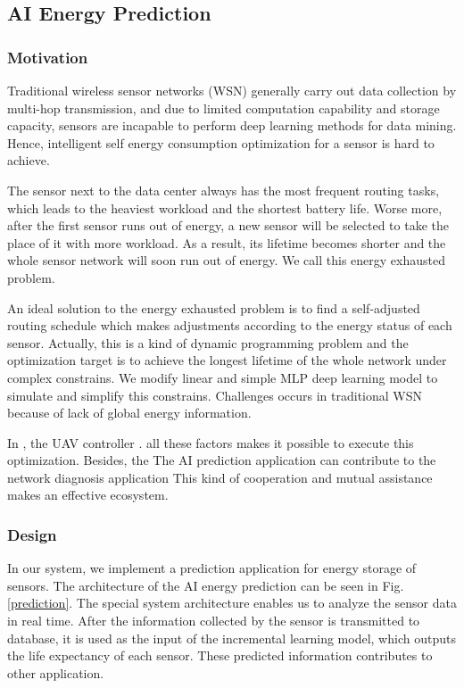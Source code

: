 \subsection{AI Energy Prediction}

\subsubsection{Motivation}
Traditional wireless sensor networks (WSN)  generally carry out data 
collection by multi-hop transmission,
and due to limited computation capability and storage capacity, sensors are incapable
to perform deep learning methods for data mining. 
Hence, intelligent self energy consumption optimization for a sensor is hard to achieve.

The sensor next to the data center always has the most frequent routing tasks, which leads to
the heaviest workload and the shortest battery life. Worse more, after the
first sensor runs out of energy, a new sensor will be selected to take the place 
of it with more workload. As a result, its lifetime becomes shorter and the whole 
sensor network will soon run out of energy. We call this energy exhausted problem.

An ideal solution to the energy exhausted problem is to find a self-adjusted routing schedule which 
makes adjustments according to the energy status of each sensor. 
Actually, this is a kind of dynamic programming problem and
the optimization target is to achieve the longest lifetime of the whole network under
complex constrains. We modify linear and simple MLP\cite{Harvey1988An} deep learning model to simulate and simplify
this constrains. Challenges occurs in traditional WSN because of lack
of global energy information. 

In {\sdn}, the UAV controller .   
all these factors makes it possible to execute
this optimization. Besides, the 
The AI prediction application can contribute to the network diagnosis application
This kind of cooperation and mutual assistance makes {\sdn} an effective ecosystem.

\subsubsection{Design}
In our {\sdn} system, we implement a prediction application for 
energy storage of sensors. The architecture of the AI energy prediction
can be seen in Fig. \ref{prediction}. The special system architecture enables
us to analyze the sensor data in real time. After the information 
collected by the sensor is transmitted to database, it is used as
the input of the incremental learning model, which outputs the
life expectancy of each sensor. These predicted information contributes
to other application. 

